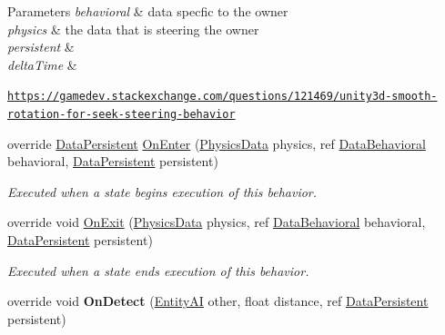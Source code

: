\begin{DoxyCompactItemize}
\begin{DoxyCompactList}
\begin{DoxyParams}{Parameters}
{\em behavioral} & data specfic to the owner\\
\hline
{\em physics} & the data that is steering the owner\\
\hline
{\em persistent} & \\
\hline
{\em delta\-Time} & \\
\hline
\end{DoxyParams}
 \href{https://gamedev.stackexchange.com/questions/121469/unity3d-smooth-rotation-for-seek-steering-behavior}{\tt https\-://gamedev.\-stackexchange.\-com/questions/121469/unity3d-\/smooth-\/rotation-\/for-\/seek-\/steering-\/behavior}  \end{DoxyCompactList}\item 
override \hyperlink{class_skyrates_1_1_a_i_1_1_behavior_1_1_data_persistent}{Data\-Persistent} \hyperlink{class_skyrates_1_1_a_i_1_1_state_1_1_state_machine_a7787302125717fb9fa158ce75541cf53}{On\-Enter} (\hyperlink{class_skyrates_1_1_physics_1_1_physics_data}{Physics\-Data} physics, ref \hyperlink{class_skyrates_1_1_a_i_1_1_behavior_1_1_data_behavioral}{Data\-Behavioral} behavioral, \hyperlink{class_skyrates_1_1_a_i_1_1_behavior_1_1_data_persistent}{Data\-Persistent} persistent)
\begin{DoxyCompactList}\small\item\em Executed when a state begins execution of this behavior. \end{DoxyCompactList}\item 
override void \hyperlink{class_skyrates_1_1_a_i_1_1_state_1_1_state_machine_ae224580487180bef7009c1b49aaded2e}{On\-Exit} (\hyperlink{class_skyrates_1_1_physics_1_1_physics_data}{Physics\-Data} physics, ref \hyperlink{class_skyrates_1_1_a_i_1_1_behavior_1_1_data_behavioral}{Data\-Behavioral} behavioral, \hyperlink{class_skyrates_1_1_a_i_1_1_behavior_1_1_data_persistent}{Data\-Persistent} persistent)
\begin{DoxyCompactList}\small\item\em Executed when a state ends execution of this behavior. \end{DoxyCompactList}\item 
\hypertarget{class_skyrates_1_1_a_i_1_1_state_1_1_state_machine_af4d282ef6ac4ca72e5fcf8b612277730}{override void {\bfseries On\-Detect} (\hyperlink{class_skyrates_1_1_entity_1_1_entity_a_i}{Entity\-A\-I} other, float distance, ref \hyperlink{class_skyrates_1_1_a_i_1_1_behavior_1_1_data_persistent}{Data\-Persistent} persistent)}\label{class_skyrates_1_1_a_i_1_1_state_1_1_state_machine_af4d282ef6ac4ca72e5fcf8b612277730}

\end{DoxyCompactItemize}
